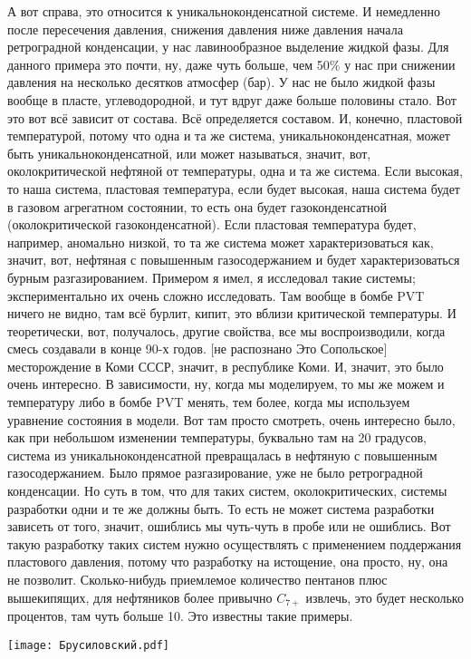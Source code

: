 \documentclass[main.tex]{subfiles}
\begin{document}
А вот справа, это относится к уникальноконденсатной системе.
И немедленно после пересечения давления, снижения давления ниже давления начала ретроградной конденсации, у нас лавинообразное выделение жидкой фазы.
Для данного примера это почти, ну, даже чуть больше, чем 50\% у нас при снижении давления на несколько десятков атмосфер (бар).
У нас не было жидкой фазы вообще в пласте, углеводородной, и тут вдруг даже больше половины стало.
Вот это вот всё зависит от состава.
Всё определяется составом.
И, конечно, пластовой температурой, потому что одна и та же система, уникальноконденсатная, может быть уникальноконденсатной, или может называться, значит, вот, околокритической нефтяной от температуры, одна и та же система.
Если высокая, то наша система, пластовая температура, если будет высокая, наша система будет в газовом агрегатном состоянии, то есть она будет газоконденсатной (околокритической газоконденсатной).
Если пластовая температура будет, например, аномально низкой, то та же система может характеризоваться как, значит, вот, нефтяная с повышенным газосодержанием и будет характеризоваться бурным разгазированием.
Примером я имел, я исследовал такие системы; экспериментально их очень сложно исследовать.
Там вообще в бомбе PVT ничего не видно, там всё бурлит, кипит, это вблизи критической температуры.
И теоретически, вот, получалось, другие свойства, все мы воспроизводили, когда смесь создавали в конце 90-х годов.
[не распознано Это Сопольское] месторождение в Коми СССР, значит, в республике Коми.
И, значит, это было очень интересно.
В зависимости, ну, когда мы моделируем, то мы же можем и температуру либо в бомбе PVT менять, тем более, когда мы используем уравнение состояния в модели.
Вот там просто смотреть, очень интересно было, как при небольшом изменении температуры, буквально там на 20 градусов, система из уникальноконденсатной превращалась в нефтяную с повышенным газосодержанием.
Было прямое разгазирование, уже не было ретроградной конденсации.
Но суть в том, что для таких систем, околокритических, системы разработки одни и те же должны быть.
То есть не может система разработки зависеть от того, значит, ошиблись мы чуть-чуть в пробе или не ошиблись.
Вот такую разработку таких систем нужно осуществлять с применением поддержания пластового давления, потому что разработку на истощение, она просто, ну, она не позволит.
Сколько-нибудь приемлемое количество пентанов плюс вышекипящих, для нефтяников более привычно $C_{7+}$ извлечь, это будет несколько процентов, там чуть больше 10.
Это известны такие примеры.

\begin{center}
\texttt{[image: Брусиловский.pdf]}
\end{center}
\end{document}
